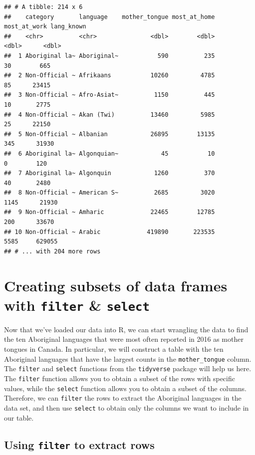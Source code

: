 \documentclass[
]{book}
\begin{document}
\begin{verbatim}
## # A tibble: 214 x 6
##    category       language    mother_tongue most_at_home most_at_work lang_known
##    <chr>          <chr>               <dbl>        <dbl>        <dbl>      <dbl>
##  1 Aboriginal la~ Aboriginal~           590          235           30        665
##  2 Non-Official ~ Afrikaans           10260         4785           85      23415
##  3 Non-Official ~ Afro-Asiat~          1150          445           10       2775
##  4 Non-Official ~ Akan (Twi)          13460         5985           25      22150
##  5 Non-Official ~ Albanian            26895        13135          345      31930
##  6 Aboriginal la~ Algonquian~            45           10            0        120
##  7 Aboriginal la~ Algonquin            1260          370           40       2480
##  8 Non-Official ~ American S~          2685         3020         1145      21930
##  9 Non-Official ~ Amharic             22465        12785          200      33670
## 10 Non-Official ~ Arabic             419890       223535         5585     629055
## # ... with 204 more rows
\end{verbatim}

\hypertarget{creating-subsets-of-data-frames-with-filter-select}{%
\section{\texorpdfstring{Creating subsets of data frames with \texttt{filter} \& \texttt{select}}{Creating subsets of data frames with filter \& select}}\label{creating-subsets-of-data-frames-with-filter-select}}

Now that we've loaded our data into R, we can start wrangling the data to
find the ten Aboriginal languages that were most often reported
in 2016 as mother tongues in Canada. In particular, we will construct
a table with the ten Aboriginal languages that have the largest
counts in the \texttt{mother\_tongue} column.
The \texttt{filter} and \texttt{select} functions from the \texttt{tidyverse} package will help us
here. The \texttt{filter}  function allows you to obtain a subset of the
rows with specific values, while the \texttt{select}  function allows you
to obtain a subset of the columns. Therefore, we can \texttt{filter} the rows to extract the
Aboriginal languages in the data set, and then use \texttt{select} to obtain only the
columns we want to include in our table.

\hypertarget{using-filter-to-extract-rows}{%
\subsection{\texorpdfstring{Using \texttt{filter} to extract rows}{Using filter to extract rows}}\label{using-filter-to-extract-rows}}
\end{document}
